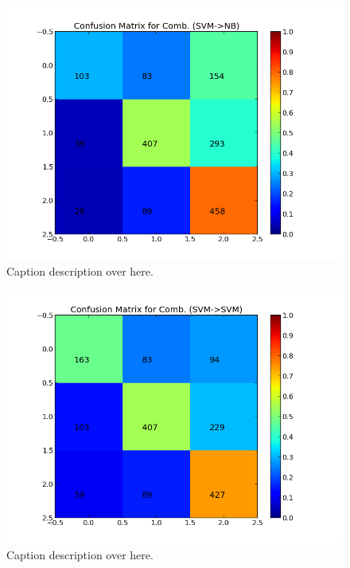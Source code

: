 \begin{minipage}[s]{\linewidth}
     \centering
     \begin{minipage}{0.45\linewidth}
          \begin{figure}[H]
               \includegraphics[width=\linewidth]{../img/plots/grid/confusion_matrix_Comb-SVM-NB.png}
           \caption[Results overview across models]{Caption description over here.}
           \label{fig:confmat_svm_nb}
          \end{figure}
     \end{minipage}
     \hspace{0.05\linewidth}
     \begin{minipage}{0.45\linewidth}
          \begin{figure}[H]
               \includegraphics[width=\linewidth]{../img/plots/grid/confusion_matrix_Comb-SVM-SVM.png}
           \caption[Results overview across models]{Caption description over here.}
           \label{fig:confmat_svm_svm}
          \end{figure}
     \end{minipage} \\
 

\end{minipage}
